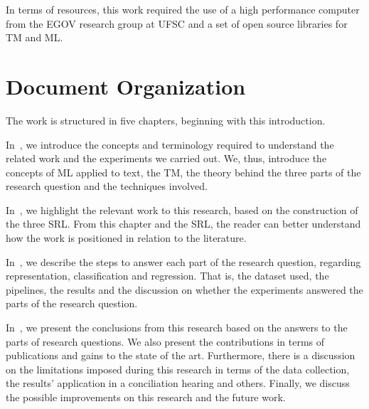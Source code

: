 In terms of resources, this work required the use of a high performance computer from the \gls{EGOV} research group at \gls{UFSC} and a set of open source libraries for \gls{TM} and \gls{ML}.

\section{Document Organization}


The work is structured in five chapters, beginning with this introduction.

In~\textbf{}, we introduce the concepts and terminology required to understand the related work and the experiments we carried out. We, thus, introduce the concepts of \gls{ML} applied to text, the \gls{TM}, the theory behind the three parts of the research question and the techniques involved.

In~\textbf{}, we highlight the relevant work to this research, based on the construction of the three \gls{SRL}. From this chapter and the \gls{SRL}, the reader can better understand how the work is positioned in relation to the literature.

In~\textbf{}, we describe the steps to answer each part of the research question, regarding representation, classification and regression. That is, the dataset used, the pipelines, the results and the discussion on whether the experiments answered the parts of the research question.

In~\textbf{}, we present the conclusions from this research based on the answers to the parts of research questions. We also present the contributions in terms of publications and gains to the state of the art. Furthermore, there is a discussion on the limitations imposed during this research in terms of the data collection, the results' application in a conciliation hearing and others. Finally, we discuss the possible improvements on this research and the future work.


